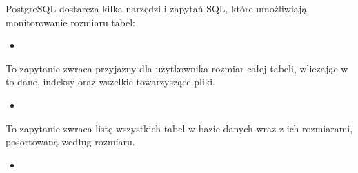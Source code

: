 \documentclass[letterpaper,10pt,polish]{sphinxmanual}
\begin{document}
\sphinxAtStartPar
{}
PostgreSQL dostarcza kilka narzędzi i zapytań SQL, które umożliwiają monitorowanie rozmiaru tabel:
\begin{itemize}
\item {} 
\sphinxAtStartPar
{}

\end{itemize}

\sphinxAtStartPar
{}

\sphinxAtStartPar
To zapytanie zwraca przyjazny dla użytkownika rozmiar całej tabeli, wliczając w to dane, indeksy oraz wszelkie towarzyszące pliki.
\begin{itemize}
\item {} 
\sphinxAtStartPar
{}

\end{itemize}

\begin{sphinxVerbatim}[commandchars=\\\{\}]
\end{sphinxVerbatim}

\sphinxAtStartPar
To zapytanie zwraca listę wszystkich tabel w bazie danych wraz z ich rozmiarami, posortowaną według rozmiaru.
\begin{itemize}
\item {} 
\sphinxAtStartPar
{}

\end{itemize}
\end{document}
